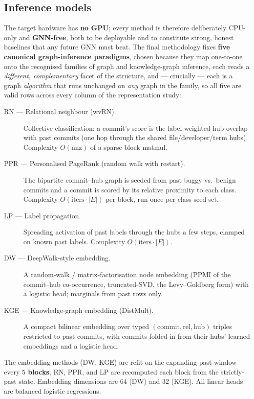 	\subsection{Inference models}
	\label{sec:setup-models}
	
	The target hardware has \textbf{no GPU}; every method is therefore deliberately
	CPU-only and \textbf{GNN-free}, both to be deployable and to constitute strong,
	honest baselines that any future GNN must beat. The final methodology fixes
	\textbf{five canonical graph-inference paradigms}, chosen because they map one-to-one
	onto the recognised families of graph and knowledge-graph inference, each reads a
	\emph{different, complementary} facet of the structure, and --- crucially --- each is a
	graph \emph{algorithm} that runs unchanged on \emph{any} graph in the family, so all
	five are valid rows across every column of the representation study:
	
	\begin{description}
		\item[RN --- Relational neighbour (wvRN).] Collective classification: a commit's
		score is the label-weighted hub-overlap with past commits (one hop through the shared
		file/developer/term hubs). Complexity $O(\mathrm{nnz})$ of a sparse block matmul.
		\item[PPR --- Personalised PageRank (random walk with restart).] The bipartite
		commit--hub graph is seeded from past buggy vs.\ benign commits and a commit is scored
		by its relative proximity to each class. Complexity $O(\text{iters}\cdot|E|)$ per
		block, run once per class seed set.
		\item[LP --- Label propagation.] Spreading activation of past labels through the
		hubs a few steps, clamped on known past labels. Complexity $O(\text{iters}\cdot|E|)$.
		\item[DW --- DeepWalk-style embedding.] A random-walk / matrix-factorisation node
		embedding (PPMI of the commit--hub co-occurrence, truncated-SVD, the Levy--Goldberg
		form) with a logistic head; marginals from past rows only.
		\item[KGE --- Knowledge-graph embedding (DistMult).] A compact bilinear embedding
		over typed $(\text{commit},\text{rel},\text{hub})$ triples restricted to past
		commits, with commits folded in from their hubs' learned embeddings and a logistic
		head.
	\end{description}
	
	The embedding methods (DW, KGE) are refit on the expanding past window every
	\textbf{$5$ blocks}; RN, PPR, and LP are recomputed each block from the strictly-past
	state. Embedding dimensions are $64$ (DW) and $32$ (KGE). All linear heads are
	balanced logistic regressions.
	
